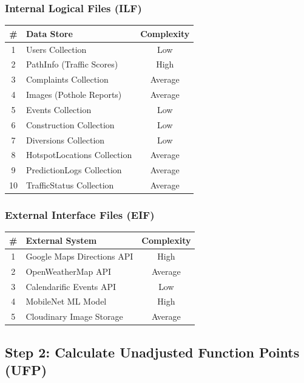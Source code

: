 \documentclass[12pt,a4paper]{article}
\begin{document}
\subsubsection*{Internal Logical Files (ILF)}
\begin{center}
\begin{tabular}{clc}
\toprule
\textbf{\#} & \textbf{Data Store} & \textbf{Complexity} \\
\midrule
1 & Users Collection & Low \\
2 & PathInfo (Traffic Scores) & High \\
3 & Complaints Collection & Average \\
4 & Images (Pothole Reports) & Average \\
5 & Events Collection & Low \\
6 & Construction Collection & Low \\
7 & Diversions Collection & Low \\
8 & HotspotLocations Collection & Average \\
9 & PredictionLogs Collection & Average \\
10 & TrafficStatus Collection & Average \\
\bottomrule
\end{tabular}
\end{center}

\subsubsection*{External Interface Files (EIF)}
\begin{center}
\begin{tabular}{clc}
\toprule
\textbf{\#} & \textbf{External System} & \textbf{Complexity} \\
\midrule
1 & Google Maps Directions API & High \\
2 & OpenWeatherMap API & Average \\
3 & Calendarific Events API & Low \\
4 & MobileNet ML Model & High \\
5 & Cloudinary Image Storage & Average \\
\bottomrule
\end{tabular}
\end{center}

\subsection{Step 2: Calculate Unadjusted Function Points (UFP)}
\end{document}
